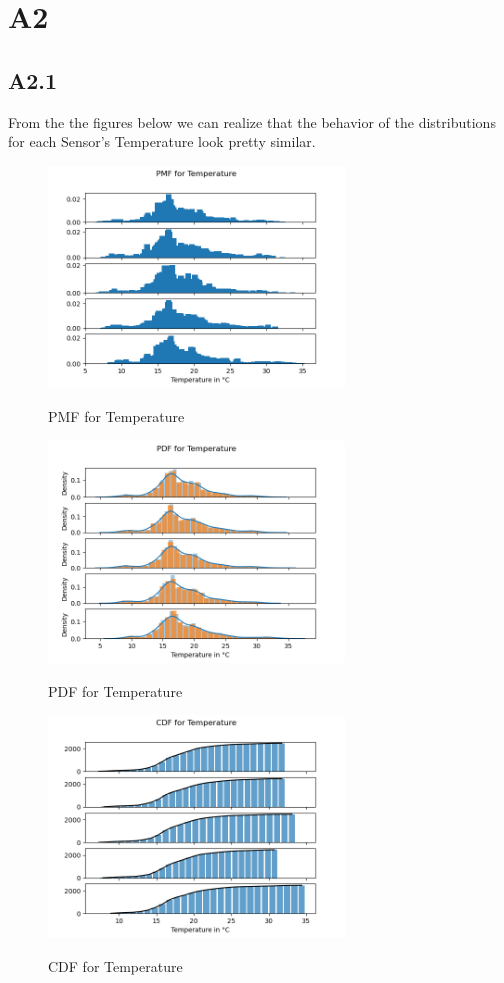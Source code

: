 \documentclass[a4paper,12pt]{article}
\begin{document}
\section{A2}
 \subsection{A2.1}
 From the the figures below we can realize that the behavior of the distributions for each Sensor's Temperature look pretty similar. 
  \begin{figure}[H] 
	\centering
	\includegraphics[width=0.7\textwidth]{PMF for Temperature.png}
	\caption{PMF for Temperature}\cite{Maiullari2020}
  \end{figure}
  \begin{figure}[H] 
	\centering
	\includegraphics[width=0.7\textwidth]{PDF for Temperature.png}
	\caption{PDF for Temperature}\cite{Maiullari2020}
  \end{figure}
  \begin{figure}[H] 
	\centering
	\includegraphics[width=0.7\textwidth]{CDF for Temperature.png}
	\caption{CDF for Temperature}\cite{Maiullari2020}
  \end{figure}
\end{document}
